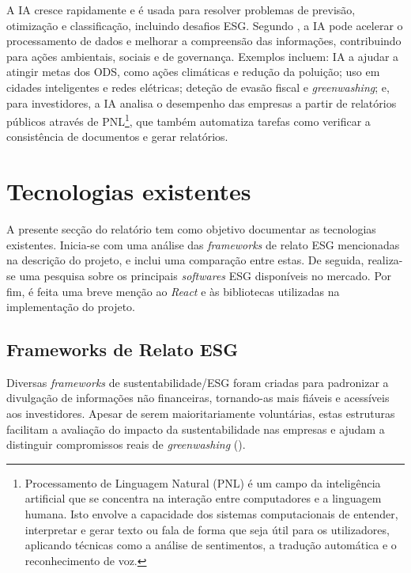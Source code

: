A \gls{IA} cresce rapidamente e é usada para resolver problemas de previsão, otimização e classificação, incluindo desafios \gls{ESG}. Segundo \cite{Burnaev2023}, a IA pode acelerar o processamento de dados e melhorar a compreensão das informações, contribuindo para ações ambientais, sociais e de governança. Exemplos incluem: IA a ajudar a atingir metas dos ODS, como ações climáticas e redução da poluição; uso em cidades inteligentes e redes elétricas; deteção de evasão fiscal e \textit{greenwashing}; e, para investidores, a IA analisa o desempenho das empresas a partir de relatórios públicos através de \gls{PNL}\footnote{Processamento de Linguagem Natural (PNL) é um campo da inteligência artificial que se concentra na interação entre computadores e a linguagem humana. Isto envolve a capacidade dos sistemas computacionais de entender, interpretar e gerar texto ou fala de forma que seja útil para os utilizadores, aplicando técnicas como a análise de sentimentos, a tradução automática e o reconhecimento de voz.}, que também automatiza tarefas como verificar a consistência de documentos e gerar relatórios.


\section{Tecnologias existentes} 
\label{sec:TechExist}

A presente secção do relatório tem como objetivo documentar as tecnologias existentes. Inicia-se com uma análise das \textit{frameworks} de relato \gls{ESG} mencionadas na descrição do projeto, e inclui uma comparação entre estas. De seguida, realiza-se uma pesquisa sobre os principais \textit{softwares} \gls{ESG} disponíveis no mercado. Por fim, é feita uma breve menção ao \textit{React} e às bibliotecas utilizadas na implementação do projeto.

\subsection{Frameworks de Relato \gls{ESG}}
\label{subsec: FRESG}

Diversas \textit{frameworks} de sustentabilidade/ESG foram criadas para padronizar a divulgação de informações não financeiras, tornando-as mais fiáveis e acessíveis aos investidores. Apesar de serem maioritariamente voluntárias, estas estruturas facilitam a avaliação do impacto da sustentabilidade nas empresas e ajudam a distinguir compromissos reais de \textit{greenwashing} (\cite{Cruz2023}).

